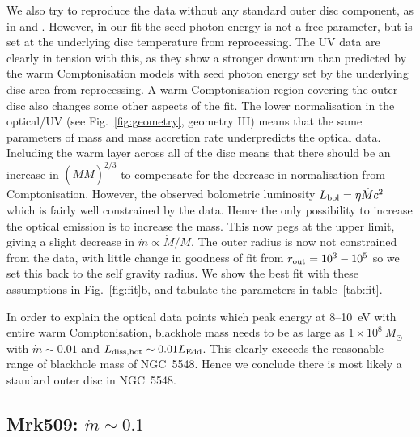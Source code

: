 \documentclass[a4paper,fleqn,usenatbib]{mnras}
\newcommand{\red}{\textcolor{red}}
\begin{document}
  We also try to reproduce the data without any standard outer disc
  component, as in \cite{5548} and \cite{petrucci2017}. However, in our fit the seed photon
  energy is not a free parameter, but is set at the underlying disc
  temperature from reprocessing. The UV data are clearly in tension with
  this, as they show a stronger downturn than predicted by the warm
  Comptonisation models with seed photon energy set by the underlying
  disc area from reprocessing. A warm Comptonisation region covering the
  outer disc also changes some other aspects of the fit. 
The lower normalisation in the optical/UV (see
Fig.~\ref{fig:geometry}, geometry III) means that
  the same parameters of mass and mass accretion rate underpredicts  the
  optical data.
 Including the
  warm layer across all of the disc means that there should be an
  increase in  $(M\dot{M})^{2/3}$ to compensate for the decrease in normalisation from Comptonisation. 
  However, the observed bolometric luminosity $L_{\rm bol} =\eta
  \dot{M} c^2$ which is fairly well constrained by the data. Hence the only
  possibility to increase the optical emission is to increase the
  mass. This now pegs at the upper
  limit, giving a slight decrease in $\dot{m}\propto
  \dot{M}/M$. The outer radius is now not constrained from the data,
  with little change in goodness of fit from $ r_{\rm out}=10^3-10^5$
  so we set this back to the self gravity radius.  We show the best
  fit with these assumptions in Fig.~\ref{fig:fit}b,
  and tabulate the parameters in table~\ref{tab:fit}. 


In order to explain the optical data points which peak energy 
 at 8--10~eV with entire warm Comptonisation, blackhole mass needs to be as large as  $1\times 10^8~M_\odot$ with $\dot{m}\sim 0.01$ and $L_{\rm diss,hot}\sim 0.01L_{\rm Edd}$. 
This clearly exceeds the reasonable range of blackhole mass of NGC~5548. 
Hence we conclude  there is most likely a standard outer disc in NGC~5548.

\subsection{Mrk509: $\dot{m}\sim 0.1$}
\label{sec:mrk509}
\end{document}
